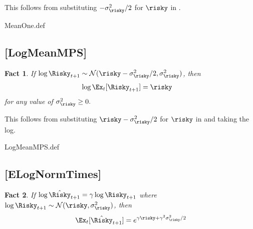 \documentclass{handout}
\newtheorem{Fact}{Fact}
\begin{document}
This follows from substituting $- \sigma_{\risky}^{2}/2$ for $\risky$ in \ELogNorm.

\begin{verbatimwrite}{MeanOne.def}
\providecommand{\MeanOne}{\href{https://www.econ2.jhu.edu/people/ccarroll/public/LectureNotes/MathFacts/MathFactsList\#MeanOne}{\ensuremath{\mathtt{[MeanOne]}}}}
\end{verbatimwrite}

\hypertarget{LogMeanMPS}{}
\subsection{[LogMeanMPS]}

\begin{Fact} If $\log \Risky_{t+1} \sim \mathcal{N}(\null{\risky}-\sigma_{\risky}^{2}/2,\sigma_{\risky}^{2})$, then
\begin{equation}\begin{gathered}\begin{aligned}
      \log  \Ex_{t}[\Risky_{t+1}] & =  \risky
\end{aligned}\end{gathered}\end{equation}
for any value of $\sigma_{\risky}^{2} \geq 0.$
\end{Fact}

This follows from substituting $\risky - \sigma_{\risky}^{2}/2$ for $\risky$ in {\ELogNorm} and taking the log.

\begin{verbatimwrite}{LogMeanMPS.def}
\providecommand{\LogMeanMPS}{\href{https://www.econ2.jhu.edu/people/ccarroll/public/LectureNotes/MathFacts/MathFactsList\#LogMeanMPS}{\ensuremath{\mathtt{[LogMeanMPS]}}}}
\end{verbatimwrite}

\hypertarget{ELogNormTimes}{}
\subsection{[ELogNormTimes]}

\begin{Fact} If $\log \hat{\Risky}_{t+1} = \gamma \log \Risky_{t+1}$ where $\log \Risky_{t+1} \sim \mathcal{N}(\risky,\sigma_{\risky}^{2})$, then
\begin{equation}
        \Ex_{t}[\hat{\Risky}_{t+1}] = e^{\gamma \risky+\gamma^{2}\sigma_{\risky}^{2}/2} \label{eq:ELogNormTimes}
\end{equation}
\end{Fact}
\end{document}
